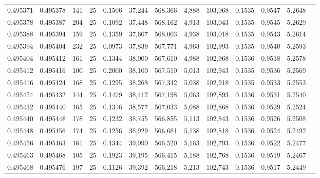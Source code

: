 \begin{tabular}{rrrrrrrrrrrrr}
0.495371 & 0.495378 & 141 &  25 &                                     0.1506 &  37,244 & 568,366 &   4,888 & 103,068 & 0.1535 & 0.9547 & 5.2648 \\
0.495378 & 0.495387 & 204 &  25 &                                     0.1092 &  37,448 & 568,162 &   4,913 & 103,043 & 0.1535 & 0.9545 & 5.2629 \\
0.495388 & 0.495394 & 159 &  25 &                                     0.1359 &  37,607 & 568,003 &   4,938 & 103,018 & 0.1535 & 0.9543 & 5.2614 \\
0.495394 & 0.495404 & 232 &  25 &                                     0.0973 &  37,839 & 567,771 &   4,963 & 102,993 & 0.1535 & 0.9540 & 5.2593 \\
0.495404 & 0.495412 & 161 &  25 &                                     0.1344 &  38,000 & 567,610 &   4,988 & 102,968 & 0.1536 & 0.9538 & 5.2578 \\
0.495412 & 0.495416 & 100 &  25 &                                     0.2000 &  38,100 & 567,510 &   5,013 & 102,943 & 0.1535 & 0.9536 & 5.2569 \\
0.495416 & 0.495424 & 168 &  25 &                                     0.1295 &  38,268 & 567,342 &   5,038 & 102,918 & 0.1535 & 0.9533 & 5.2553 \\
0.495424 & 0.495432 & 144 &  25 &                                     0.1479 &  38,412 & 567,198 &   5,063 & 102,893 & 0.1536 & 0.9531 & 5.2540 \\
0.495432 & 0.495440 & 165 &  25 &                                     0.1316 &  38,577 & 567,033 &   5,088 & 102,868 & 0.1536 & 0.9529 & 5.2524 \\
0.495440 & 0.495448 & 178 &  25 &                                     0.1232 &  38,755 & 566,855 &   5,113 & 102,843 & 0.1536 & 0.9526 & 5.2508 \\
0.495448 & 0.495456 & 174 &  25 &                                     0.1256 &  38,929 & 566,681 &   5,138 & 102,818 & 0.1536 & 0.9524 & 5.2492 \\
0.495456 & 0.495463 & 161 &  25 &                                     0.1344 &  39,090 & 566,520 &   5,163 & 102,793 & 0.1536 & 0.9522 & 5.2477 \\
0.495463 & 0.495468 & 105 &  25 &                                     0.1923 &  39,195 & 566,415 &   5,188 & 102,768 & 0.1536 & 0.9519 & 5.2467 \\
0.495468 & 0.495476 & 197 &  25 &                                     0.1126 &  39,392 & 566,218 &   5,213 & 102,743 & 0.1536 & 0.9517 & 5.2449 \\

\end{tabular}
